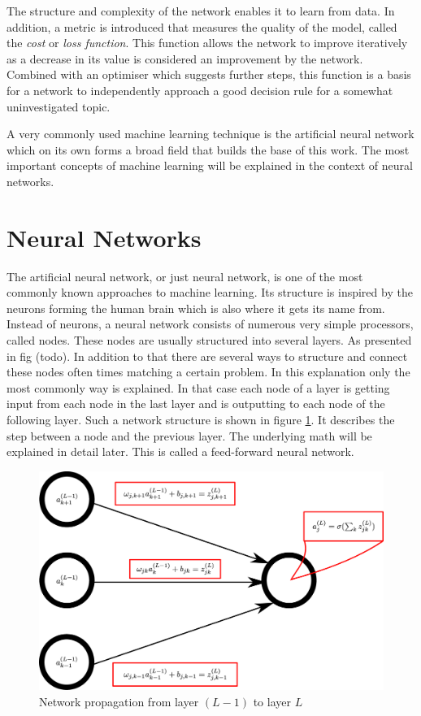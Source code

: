 The structure and complexity of the network enables it to learn from data. In addition, a metric is introduced that measures the quality of the model, called the \emph{cost} or \emph{loss function}. This function allows the network to improve iteratively as a decrease in its value is considered an improvement by the network. Combined with an optimiser which suggests further steps, this function is a basis for a network to independently approach a good decision rule for a somewhat uninvestigated topic.

A very commonly used machine learning technique is the artificial neural network which on its own forms a broad field that builds the base of this work. The most important concepts of machine learning will be explained in the context of neural networks.

\section{Neural Networks}

The artificial neural network, or just neural network, is one of the most commonly known approaches to machine learning. Its structure is inspired by the neurons forming the human brain which is also where it gets its name from.\\
Instead of neurons, a neural network consists of numerous very simple processors, called nodes. These nodes are usually structured into several layers. As presented in fig (todo). In addition to that there are several ways to structure and connect these nodes often times matching a certain problem. In this explanation only the most commonly way is explained. In that case each node of a layer is getting input from each node in the last layer and is outputting to each node of the following layer. Such a network structure is shown in figure \ref{fig:nodes_nomenclature}. It describes the step between a node and the previous layer. The underlying math will be explained in detail later. This is called a feed-forward neural network.

\begin{figure}[htbp]
	\centering
	\includegraphics[scale=0.18]{figures_ML/nodes_nomenclature.eps}
	\caption[Network parameter nomenclature]{Network propagation from layer $(L-1)$ to layer $L$}
	\label{fig:nodes_nomenclature}
\end{figure}


